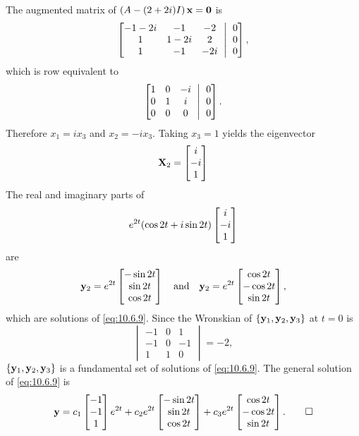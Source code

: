 \begin{solution}
The augmented  matrix of $\left(A-(2+2i)I\right)\mathbf{x}=\mathbf{0}$ is
\[
\amatrix{-1-2i&-1&-2\\1&1-2i&2\\1&-1&-2i}{0\\0\\0},
\]
which is row equivalent to
\[
\amatrix{1&0&-i\\0&1&i\\0&0&0}{0\\0\\0}.
\]
Therefore $x_1=ix_3$ and $x_2=-ix_3$. Taking $x_3=1$ yields
the eigenvector
\[
\mathbf{X}_2=\begin{bmatrix}i\\-i\\1\end{bmatrix}
\]
The real and imaginary parts of
\[
e^{2t}(\cos2t+i\sin2t)\begin{bmatrix}i\\-i\\1\end{bmatrix}
\]
are
\[
\mathbf{y}_2=e^{2t}\begin{bmatrix}-\sin2t\\\sin2t\\\cos2t\end{bmatrix}
\quad\text{and}\quad
\mathbf{y}_2=e^{2t}\begin{bmatrix}\cos2t\\-\cos2t\\\sin2t\end{bmatrix},
\]
which are solutions of  \eqref{eq:10.6.9}.
Since  the Wronskian of $\{\mathbf{y}_1,\mathbf{y}_2,\mathbf{y}_3\}$
at $t=0$ is
\[
\begin{vmatrix}-1&0&1\\-1&0&-1\\1&1&0\end{vmatrix}=-2,
\]
$\{\mathbf{y}_1,\mathbf{y}_2,\mathbf{y}_3\}$ is a fundamental set of solutions
of \eqref{eq:10.6.9}.  The general solution of \eqref{eq:10.6.9} is
\[
\mathbf{y}=c_1\begin{bmatrix}-1\\-1\\1\end{bmatrix}e^{2t}+
c_2e^{2t}\begin{bmatrix}-\sin2t\\\sin2t\\\cos2t\end{bmatrix}+
c_3e^{2t}\begin{bmatrix}\cos2t\\-\cos2t\\\sin2t\end{bmatrix}.\qedhere
\]
\end{solution}



